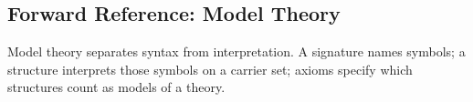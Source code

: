 \subsection{Forward Reference: Model Theory}
\label{subsec:forward-reference-model-theory}

\begin{remark*}[Exposition]
Model theory separates syntax from interpretation.  A signature names symbols;
a structure interprets those symbols on a carrier set; axioms specify which
structures count as models of a theory.
\end{remark*}
